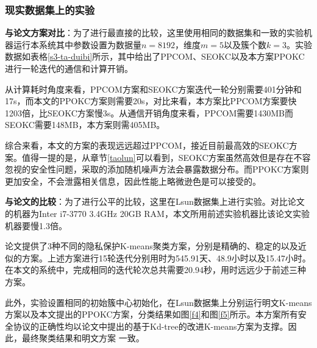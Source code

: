 \subsubsection{现实数据集上的实验}
\textbf{与论文\cite{wu2020secure}方案对比}：为了进行最直接的比较，这里使用相同的数据集和一致的实验机器运行本系统其中参数设置为数据量$n=8192$，维度$ m=5 $以及簇个数$k=3$。实验数据如表格\ref{s3-ta-duibi}所示，其中给出了PPCOM\cite{rong2017privacy}、SEOKC\cite{wu2020secure}以及本方案PPOKC进行一轮迭代的通信和计算开销。

\begin{table}[htbp]
	\centering
	\renewcommand{\arraystretch}{1.3} %
	\caption{通信与计算开销对比}
	\label{s3-ta-duibi}
\end{table}
从计算耗时角度来看，PPCOM方案和SEOKC方案迭代一轮分别需要401分钟和17s，而本文的PPOKC方案则需要20s，对比来看，本方案比PPCOM方案要快1203倍，比SEOKC方案慢3s。从通信开销角度来看，PPCOM需要1430MB而SEOKC需要148MB，本方案则需405MB。

综合来看，本文的方案的表现远远超过PPCOM，接近目前最高效的SEOKC方案。值得一提的是，从章节\ref{taolun}可以看到，SEOKC方案虽然高效但是存在不容忽视的安全性问题，采取的添加随机噪声方法会暴露数据分布。而PPOKC方案则更加安全，不会泄露相关信息，因此性能上略微逊色是可以接受的。

\textbf{与论文\cite{jaschke2019unsupervised}的比较}：为了进行公平的比较，这里在Lsun数据集上进行实验。对比论文的机器为Inter i7-3770 3.4GHz 20GB RAM，本文所用前述实验机器比该论文实验机器要慢1.3倍。

论文\cite{jaschke2019unsupervised}提供了3种不同的隐私保护K-means聚类方案，分别是精确的、稳定的以及近似的方案。上述方案进行15轮迭代分别用时为545.91天、48.9小时以及15.47小时。在本文的系统中，完成相同的迭代轮次总共需要20.94秒，用时远远少于前述三种方案。

此外，实验设置相同的初始簇中心初始化，在Lsun数据集上分别运行明文K-means方案以及本文提出的PPOKC方案，分类结果如图\ref{f4}和图\ref{f5}所示。本方案所有安全协议的正确性均以论文\cite{kanungo2002efficient}中提出的基于Kd-tree的改进K-means方案为支撑。因此，最终聚类结果和明文方案  一致。

